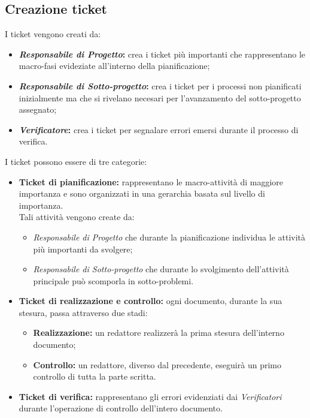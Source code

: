   \subsection{Creazione ticket}
    I ticket vengono creati da:
    \begin{itemize}
      \item \textbf{\emph{Responsabile di Progetto}: }crea i ticket più importanti che rappresentano le macro-fasi evideziate
      all'interno della pianificazione;
      \item \textbf{\emph{Responsabile di Sotto-progetto}: }crea i ticket per i processi non pianificati inizialmente ma che si rivelano necesari
      per l'avanzamento del sotto-progetto assegnato;
      \item \textbf{\emph{Verificatore}: }crea i ticket per segnalare errori emersi durante il processo di verifica.
    \end{itemize}
    I ticket possono essere di tre categorie:
    \begin{itemize}
      \item \textbf{Ticket di pianificazione: }rappresentano le macro-attività di maggiore importanza e sono organizzati in una gerarchia
      basata sul livello di importanza.\\
      Tali attività vengono create da:
      \bgroup
        \begin{itemize}
          \item \emph{Responsabile di Progetto} che durante la pianificazione individua le attività più importanti da svolgere;
          \item \emph{Responsabile di Sotto-progetto} che durante lo svolgimento dell'attività principale può scomporla in sotto-problemi.
        \end{itemize}
      \egroup
      \item \textbf{Ticket di realizzazione e controllo: }ogni documento, durante la sua stesura, passa attraverso due stadi:
      \bgroup
        \begin{itemize}
          \item \textbf{Realizzazione: }un redattore realizzerà la prima stesura dell'interno documento;
          \item \textbf{Controllo: }un redattore, diverso dal precedente, eseguirà un primo controllo di tutta la parte scritta.
        \end{itemize}
      \egroup
      \item \textbf{Ticket di verifica: }rappresentano gli errori evidenziati dai \emph{Verificatori} durante l'operazione di controllo dell'intero documento.
    \end{itemize}
